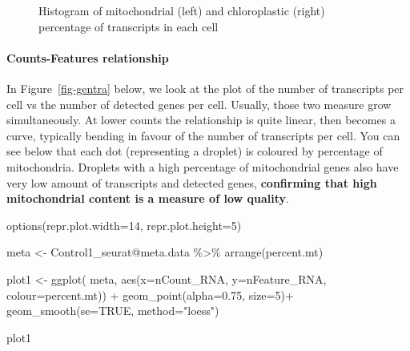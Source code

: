 \documentclass[
  letterpaper,
  DIV=11,
  numbers=noendperiod]{scrartcl}
\let\oldparagraph\paragraph
\renewcommand{\paragraph}[1]{\oldparagraph{#1}\mbox{}}
\newenvironment{Shaded}{\begin{snugshade}}{\end{snugshade}}
\newcommand{\AttributeTok}[1]{\textcolor[rgb]{0.40,0.45,0.13}{#1}}
\newcommand{\ConstantTok}[1]{\textcolor[rgb]{0.56,0.35,0.01}{#1}}
\newcommand{\DecValTok}[1]{\textcolor[rgb]{0.68,0.00,0.00}{#1}}
\newcommand{\FloatTok}[1]{\textcolor[rgb]{0.68,0.00,0.00}{#1}}
\newcommand{\FunctionTok}[1]{\textcolor[rgb]{0.28,0.35,0.67}{#1}}
\newcommand{\NormalTok}[1]{\textcolor[rgb]{0.00,0.23,0.31}{#1}}
\newcommand{\OtherTok}[1]{\textcolor[rgb]{0.00,0.23,0.31}{#1}}
\newcommand{\SpecialCharTok}[1]{\textcolor[rgb]{0.37,0.37,0.37}{#1}}
\newcommand{\StringTok}[1]{\textcolor[rgb]{0.13,0.47,0.30}{#1}}
\begin{document}
\begin{figure}[H]


\caption{\label{fig-mt}Histogram of mitochondrial (left) and
chloroplastic (right) percentage of transcripts in each cell}

\end{figure}%

\paragraph{Counts-Features
relationship}\label{counts-features-relationship}

In Figure~\ref{fig-gentra} below, we look at the plot of the number of
transcripts per cell vs the number of detected genes per cell. Usually,
those two measure grow simultaneously. At lower counts the relationship
is quite linear, then becomes a curve, typically bending in favour of
the number of transcripts per cell. You can see below that each dot
(representing a droplet) is coloured by percentage of mitochondria.
Droplets with a high percentage of mitochondrial genes also have very
low amount of transcripts and detected genes, \textbf{confirming that
high mitochondrial content is a measure of low quality}.

\begin{Shaded}
\begin{Highlighting}[]
\FunctionTok{options}\NormalTok{(}\AttributeTok{repr.plot.width=}\DecValTok{14}\NormalTok{, }\AttributeTok{repr.plot.height=}\DecValTok{5}\NormalTok{)}

\NormalTok{meta }\OtherTok{\textless{}{-}}\NormalTok{ Control1\_seurat}\SpecialCharTok{@}\NormalTok{meta.data }\SpecialCharTok{\%\textgreater{}\%} \FunctionTok{arrange}\NormalTok{(percent.mt)}

\NormalTok{plot1 }\OtherTok{\textless{}{-}} \FunctionTok{ggplot}\NormalTok{( meta, }\FunctionTok{aes}\NormalTok{(}\AttributeTok{x=}\NormalTok{nCount\_RNA, }\AttributeTok{y=}\NormalTok{nFeature\_RNA, }\AttributeTok{colour=}\NormalTok{percent.mt)) }\SpecialCharTok{+} 
         \FunctionTok{geom\_point}\NormalTok{(}\AttributeTok{alpha=}\FloatTok{0.75}\NormalTok{, }\AttributeTok{size=}\DecValTok{5}\NormalTok{)}\SpecialCharTok{+}
         \FunctionTok{geom\_smooth}\NormalTok{(}\AttributeTok{se=}\ConstantTok{TRUE}\NormalTok{, }\AttributeTok{method=}\StringTok{"loess"}\NormalTok{)}

\NormalTok{plot1}
\end{Highlighting}
\end{Shaded}
\end{document}
